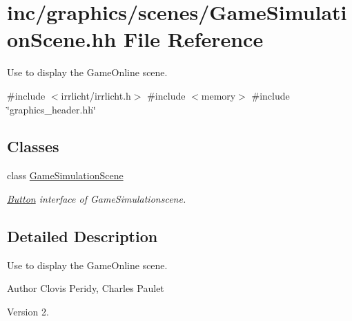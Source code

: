 \hypertarget{GameSimulationScene_8hh}{}\section{inc/graphics/scenes/\+Game\+Simulation\+Scene.hh File Reference}
\label{GameSimulationScene_8hh}


Use to display the Game\+Online scene.  


{\ttfamily \#include $<$irrlicht/irrlicht.\+h$>$}\newline
{\ttfamily \#include $<$memory$>$}\newline
{\ttfamily \#include \char`\"{}graphics\+\_\+header.\+hh\char`\"{}}\newline
\subsection*{Classes}
\begin{DoxyCompactItemize}
\item 
class \hyperlink{classGameSimulationScene}{Game\+Simulation\+Scene}
\begin{DoxyCompactList}\small\item\em \hyperlink{classButton}{Button} interface of Game\+Simulationscene. \end{DoxyCompactList}\end{DoxyCompactItemize}


\subsection{Detailed Description}
Use to display the Game\+Online scene. 

\begin{DoxyAuthor}{Author}
Clovis Peridy, Charles Paulet 
\end{DoxyAuthor}
\begin{DoxyVersion}{Version}
2. 
\end{DoxyVersion}
